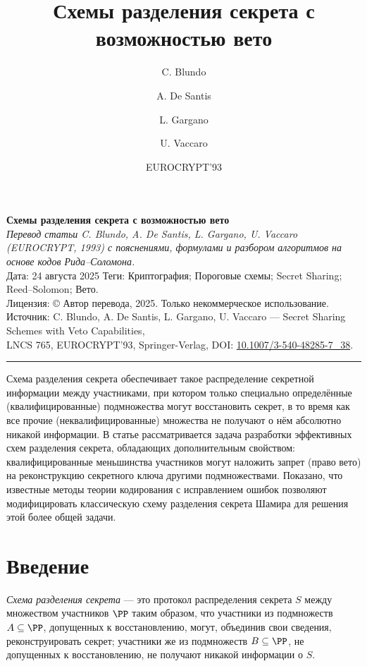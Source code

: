 \documentclass[a4paper,12pt]{article}
\title{Схемы разделения секрета с возможностью вето}
\author{C. Blundo \and A. De Santis \and L. Gargano \and U. Vaccaro}
\date{EUROCRYPT'93}
\begin{document}
\begin{center}
{\LARGE \textbf{Схемы разделения секрета с возможностью вето}}\\[0.5em]
\emph{Перевод статьи C. Blundo, A. De Santis, L. Gargano, U. Vaccaro (EUROCRYPT, 1993) с пояснениями, формулами и разбором алгоритмов на основе кодов Рида–Соломона.}\\[0.5em]
\small Дата: 24 августа 2025 \quad
Теги: Криптография; Пороговые схемы; Secret Sharing; Reed–Solomon; Вето.\\[0.25em]
\small Лицензия: © Автор перевода, 2025. Только некоммерческое использование.\\[0.25em]
\small Источник: C. Blundo, A. De Santis, L. Gargano, U. Vaccaro — Secret Sharing Schemes with Veto Capabilities,\\
LNCS 765, EUROCRYPT’93, Springer-Verlag, DOI: \href{https://doi.org/10.1007/3-540-48285-7_38}{10.1007/3-540-48285-7\_38}.
\end{center}

\vspace{0.5em}
\hrule
\vspace{1em}

\begin{center}
Схема разделения секрета обеспечивает такое распределение секретной информации между участниками, при котором только специально определённые (квалифицированные) подмножества могут восстановить секрет, в то время как все прочие (неквалифицированные) множества не получают о нём абсолютно никакой информации. В статье рассматривается задача разработки эффективных схем разделения секрета, обладающих дополнительным свойством: квалифицированные меньшинства участников могут наложить запрет (право вето) на реконструкцию секретного ключа другими подмножествами. Показано, что известные методы теории кодирования с исправлением ошибок позволяют модифицировать классическую схему разделения секрета Шамира для решения этой более общей задачи.
\end{center}

\section{Введение}

\textit{Схема разделения секрета} --- это протокол распределения секрета $S$ между множеством участников $\PP$ таким образом, что участники из подмножеств $A \subseteq \PP$, допущенных к восстановлению, могут, объединив свои сведения, реконструировать секрет; участники же из подмножеств $B \subseteq \PP$, не допущенных к восстановлению, не получают никакой информации о $S$.
\end{document}
